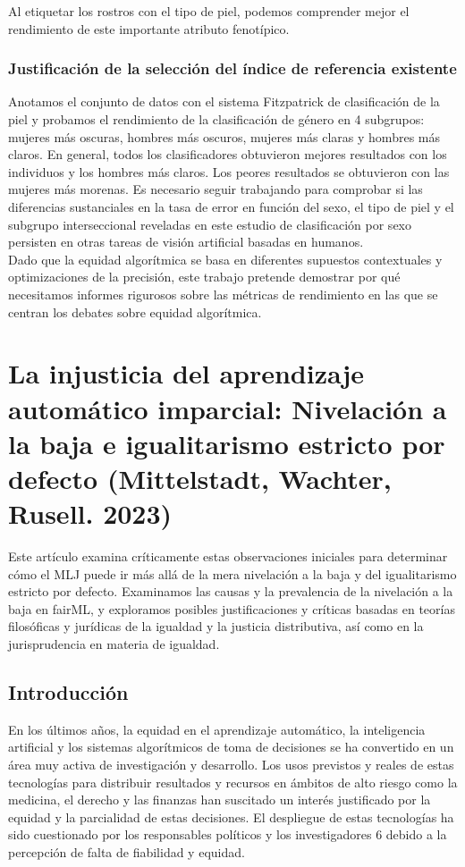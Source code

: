 Al etiquetar los rostros con el tipo de piel, podemos comprender mejor el rendimiento de este importante atributo fenotípico.


\subsection{Justificación de la selección del índice de referencia existente}

Anotamos el conjunto de datos con el sistema Fitzpatrick de clasificación de la piel y probamos el rendimiento de la clasificación de género en 4 subgrupos: mujeres más oscuras, hombres más oscuros, mujeres más claras y hombres más claros. En general, todos los clasificadores obtuvieron mejores resultados con los individuos y los hombres más claros. Los peores resultados se obtuvieron con las mujeres más morenas. Es necesario seguir trabajando para comprobar si las diferencias sustanciales en la tasa de error en función del sexo, el tipo de piel y el subgrupo interseccional reveladas en este estudio de clasificación por sexo persisten en otras tareas de visión artificial basadas en humanos.\\

Dado que la equidad algorítmica se basa en diferentes supuestos contextuales y optimizaciones de la precisión, este trabajo pretende demostrar por qué necesitamos informes rigurosos sobre las métricas de rendimiento en las que se centran los debates sobre equidad algorítmica.


\chapter{La injusticia del aprendizaje automático imparcial: Nivelación a la baja e igualitarismo estricto por defecto (Mittelstadt, Wachter, Rusell. 2023)}

Este artículo examina críticamente estas observaciones iniciales para determinar cómo el MLJ puede ir más allá de la mera nivelación a la baja y del igualitarismo estricto por defecto. Examinamos las causas y la prevalencia de la nivelación a la baja en fairML, y exploramos posibles justificaciones y críticas basadas en teorías filosóficas y jurídicas de la igualdad y la justicia distributiva, así como en la jurisprudencia en materia de igualdad. 

\section{Introducción}
En los últimos años, la equidad en el aprendizaje automático, la inteligencia artificial y los sistemas algorítmicos de toma de decisiones se ha convertido en un área muy activa de investigación y desarrollo. Los usos previstos y reales de estas tecnologías para distribuir resultados y recursos en ámbitos de alto riesgo como la medicina, el derecho y las finanzas han suscitado un interés justificado por la equidad y la parcialidad de estas decisiones. El despliegue de estas tecnologías ha sido cuestionado por los responsables políticos y los investigadores 6 debido a la percepción de falta de fiabilidad y equidad. \\

